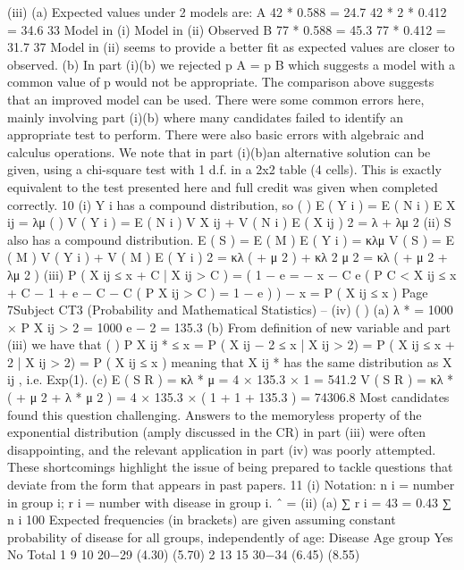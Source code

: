 \documentclass[a4paper,12pt]{article}
\begin{document}
\begin{enumerate}
(iii)
(a)
Expected values under 2 models are:
A
42 * 0.588 = 24.7
42 * 2 * 0.412 = 34.6
33
Model in (i)
Model in (ii)
Observed
B
77 * 0.588 = 45.3
77 * 0.412 = 31.7
37
Model in (ii) seems to provide a better fit as expected values are
closer to observed.
(b)
In part (i)(b) we rejected p A = p B which suggests a model with a
common value of p would not be appropriate. The comparison above
suggests that an improved model can be used.
There were some common errors here, mainly involving part (i)(b) where many candidates
failed to identify an appropriate test to perform. There were also basic errors with algebraic
and calculus operations.
We note that in part (i)(b)an alternative solution can be given, using a chi-square test with
1 d.f. in a 2x2 table (4 cells). This is exactly equivalent to the test presented here and full
credit was given when completed correctly.
10
(i)
Y i has a compound distribution, so
( )
E ( Y i ) = E ( N i ) E X ij = λμ
( )
V ( Y i ) = E ( N i ) V X ij + V ( N i ) E ( X ij ) 2 = λ + λμ 2
(ii)
S also has a compound distribution.
E ( S ) = E ( M ) E ( Y i ) = κλμ
V ( S ) = E ( M ) V ( Y i ) + V ( M ) E ( Y i ) 2 = κλ (  + μ 2 ) + κλ 2 μ 2 = κλ (  + μ 2 + λμ 2 )
(iii)
P ( X ij ≤ x + C | X ij > C ) =
( 1 − e
=
− x − C
e
(
P C < X ij ≤ x + C
− 1 + e − C
− C
(
P X ij > C
) = 1 − e
)
)
− x
= P ( X ij ≤ x )
Page 7Subject CT3 (Probability and Mathematical Statistics) – %
(iv)
(
)
(a) λ * = 1000 × P X ij > 2 = 1000 e − 2 = 135.3
(b) From definition of new variable and part (iii) we have that
(
)
P X ij * ≤ x = P ( X ij − 2 ≤ x | X ij > 2) = P ( X ij ≤ x + 2 | X ij > 2) = P ( X ij ≤ x )
meaning that X ij * has the same distribution as X ij , i.e. Exp(1).
(c)
E ( S R ) = κλ * μ = 4 × 135.3 × 1 = 541.2
V ( S R ) = κλ * (  + μ 2 + λ * μ 2 ) = 4 × 135.3 × ( 1 + 1 + 135.3 ) = 74306.8
Most candidates found this question challenging. Answers to the memoryless property of the
exponential distribution (amply discussed in the CR) in part (iii) were often disappointing,
and the relevant application in part (iv) was poorly attempted. These shortcomings highlight
the issue of being prepared to tackle questions that deviate from the form that appears in
past papers.
11
(i)
Notation: n i = number in group i; r i = number with disease in group i.
\theta ˆ =
(ii)
(a)
∑ r i = 43 = 0.43
∑ n i 100
Expected frequencies (in brackets) are given assuming constant
probability of disease for all groups, independently of age:
Disease
Age group Yes
No
Total
1
9
10
20−29
(4.30) (5.70)
2
13
15
30−34
(6.45) (8.55)

\end{enumerate}
\end{document}
